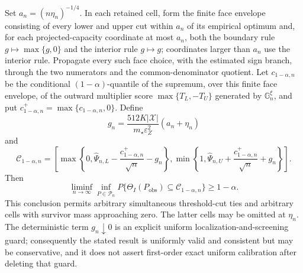 Set \(a_n=(n\eta_n)^{-1/4}\).  In each retained cell, form the finite face envelope consisting of every lower and upper cut within \(a_n\) of its empirical optimum and, for each projected-capacity coordinate at most \(a_n\), both the boundary rule \(g\mapsto\max\{g,0\}\) and the interior rule \(g\mapsto g\); coordinates larger than \(a_n\) use the interior rule.  Propagate every such face choice, with the estimated sign branch, through the two numerators and the common-denominator quotient.  Let \(c_{1-\alpha,n}\) be the conditional \((1-\alpha)\)-quantile of the supremum, over this finite face envelope, of the outward multiplier score \(\max\{T_L,-T_U\}\) generated by \(\mathbb G_n^\xi\), and put \(c_{1-\alpha,n}^+=\max\{c_{1-\alpha,n},0\}\).  Define
\[
g_n=\frac{512K|\mathcal X|}{m_\star\varepsilon_Z^2}(a_n+\eta_n)
\]
and
\[
\mathcal C_{1-\alpha,n}=
\left[\max\left\{0,\widehat\Psi_{n,L}-\frac{c_{1-\alpha,n}^+}{\sqrt n}-g_n\right\},
\min\left\{1,\widehat\Psi_{n,U}+\frac{c_{1-\alpha,n}^+}{\sqrt n}+g_n\right\}\right].
\]
Then
\[
\liminf_{n\to\infty}\inf_{P\in\mathcal P_n}
P\{\Theta_I(P_{\mathrm{obs}})\subseteq\mathcal C_{1-\alpha,n}\}\ge1-\alpha.
\]
This conclusion permits arbitrary simultaneous threshold-cut ties and arbitrary cells with survivor mass approaching zero.  The latter cells may be omitted at \(\eta_n\).  The deterministic term \(g_n\downarrow0\) is an explicit uniform localization-and-screening guard; consequently the stated result is uniformly valid and consistent but may be conservative, and it does not assert first-order exact uniform calibration after deleting that guard.